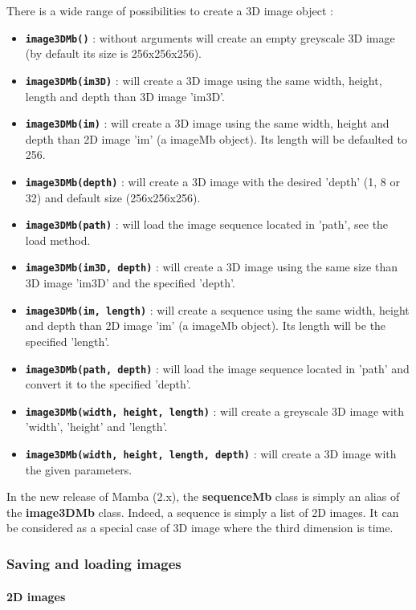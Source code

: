\documentclass[a4paper,10pt,oneside]{article}
\begin{document}
There is a wide range of possibilities to create a 3D image object :
\begin{itemize}
\item \texttt{\textbf{image3DMb()}} : without arguments will create an empty
greyscale 3D image (by default its size is 256x256x256).
\item \texttt{\textbf{image3DMb(im3D)}} : will create a 3D image using the
same width, height, length and depth than 3D image 'im3D'.
\item \texttt{\textbf{image3DMb(im)}} : will create a 3D image using the same
width, height and depth than 2D image 'im' (a imageMb object). Its
length will be defaulted to 256.
\item \texttt{\textbf{image3DMb(depth)}} : will create a 3D image with the
desired 'depth' (1, 8 or 32) and default size (256x256x256).
\item \texttt{\textbf{image3DMb(path)}} : will load the image sequence located
in 'path', see the load method.
\item \texttt{\textbf{image3DMb(im3D, depth)}} : will create a 3D image using
the same size than 3D image 'im3D' and the specified 'depth'.
\item \texttt{\textbf{image3DMb(im, length)}} : will create a sequence using
the same width, height and depth than 2D image 'im' (a imageMb object). Its
length will be the specified 'length'.
\item \texttt{\textbf{image3DMb(path, depth)}} : will load the image sequence
located in 'path' and convert it to the specified 'depth'.
\item \texttt{\textbf{image3DMb(width, height, length)}} : will create a 
greyscale 3D image with 'width', 'height' and 'length'.
\item \texttt{\textbf{image3DMb(width, height, length, depth)}} : will create
a 3D image with the given parameters.
\end{itemize}

In the new release of Mamba (2.x), the \textbf{sequenceMb} class is simply an alias of the \textbf{image3DMb} class.
Indeed, a sequence is simply a list of 2D images. It can be considered as a special case of 3D image where
the third dimension is time.

\subsubsection{Saving and loading images}

\paragraph{2D images\\}
\end{document}
